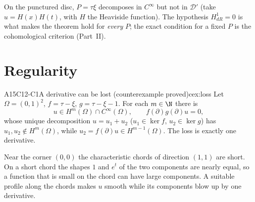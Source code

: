 \begin{caution}[title={For a fixed $P$ the condition is subtler}]
On the punctured disc, $P=\tau\xi$ decomposes in $C^\infty$ but not in $\mathcal D'$ (take $u=H(x)H(t)$, with $H$ the Heaviside function). The hypothesis $H^1_{dR}=0$ is what makes the theorem hold for \emph{every} $P$; the exact condition for a fixed $P$ is the cohomological criterion  (Part~II).
\end{caution}

\section{Regularity}

\begin{dimcard}{A15}{C12-C1}{A derivative can be lost}{\falsest{} (counterexample proved)}{cex:loss}
Let $\Omega=(0,1)^2$, $f=\tau-\xi$, $g=\tau-\xi-1$. For each $m\in\N$ there is
\[
u\in H^m(\Omega)\cap C^\infty(\Omega),\qquad f(\partial)g(\partial)u=0,
\]
whose unique decomposition $u=u_1+u_2$ ($u_1\in\ker f$, $u_2\in\ker g$) has $u_1,u_2\notin H^m(\Omega)$, while $u_2=f(\partial)u\in H^{m-1}(\Omega)$. The loss is exactly one derivative.
\end{dimcard}

\begin{proofidea}
Near the corner $(0,0)$ the characteristic chords of direction $(1,1)$ are short. On a short chord the shapes $1$ and $e^t$ of the two components are nearly equal, so a function that is small on the chord can have large components. A suitable profile along the chords makes $u$ smooth while its components blow up by one derivative.
\end{proofidea}

